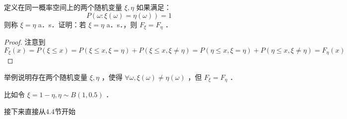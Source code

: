 \begin{exercise}
    定义在同一概率空间上的两个随机变量 $\xi, \eta$ 如果满足：
    $$
        P(\omega: \xi(\omega)=\eta(\omega))=1
    $$
    则称 $\xi=\eta$ a．s．证明：若 $\xi=\eta$ a．s．，则 $F_{\xi}=F_\eta$ ．
\end{exercise}
\begin{proof}
    注意到
    $$
        F_{\xi}(x)=P(\xi \leq x)=P(\xi \leq x, \xi=\eta)+P(\xi \leq x, \xi \neq \eta)=P(\eta \leq x, \xi=\eta)+P(\eta \leq x, \xi \neq \eta)=F_\eta(x)
    $$
\end{proof}

\begin{exercise}
    举例说明存在两个随机变量 $\xi, \eta$ ，使得 $\forall \omega, \xi(\omega) \neq \eta(\omega)$ ，但 $F_{\xi}=F_\eta$ ．
\end{exercise}
\begin{solution}
    比如令 $\xi=1-\eta, \eta \sim B(1,0.5)$ ．
\end{solution}

\begin{kaobox}
    接下来直接从4.4节开始
\end{kaobox}


